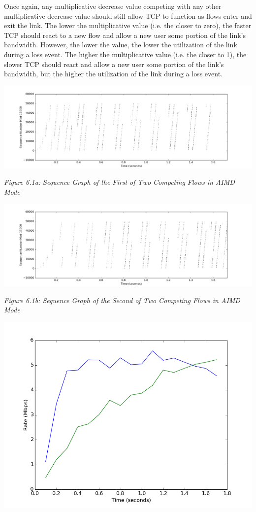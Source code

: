 \documentclass[11pt]{article}
\begin{document}
Once again, any multiplicative decrease value competing with any other multiplicative decrease value should still allow TCP to function as flows enter and exit the link. The lower the multiplicative value (i.e. the closer to zero), the faster TCP should react to a new flow and allow a new user some portion of the link's bandwidth. However, the lower the value, the lower the utilization of the link during a loss event. The higher the multiplicative value (i.e. the closer to 1), the slower TCP should react and allow a new user some portion of the link's bandwidth, but the higher the utilization of the link during a loss event.

\includegraphics[width=17cm]{outputs/competingAIMD/competingAIMD_sequence1000.png}

\centerline{\emph{Figure 6.1a: Sequence Graph of the First of Two Competing Flows in AIMD Mode}}

\includegraphics[width=17cm]{outputs/competingAIMD/competingAIMD_sequence2000.png}

\centerline{\emph{Figure 6.1b: Sequence Graph of the Second of Two Competing Flows in AIMD Mode}}


\includegraphics[width=17cm]{outputs/competingAIMD/competingAIMD_rate.png}
\end{document}
